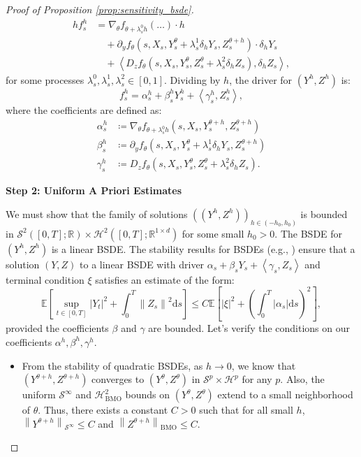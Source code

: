\documentclass[qian]{imsart}
\newcommand{\R}{\mathbb{R}}
\newcommand{\E}{\mathbb{E}}
\newcommand{\dd}{\mathrm{d}}
\newcommand{\norm}[1]{\left\lVert#1\right\rVert}
\newcommand{\abs}[1]{\left\lvert#1\right\rvert}
\newcommand{\scpr}[2]{\left\langle #1, #2 \right\rangle}
\theoremstyle{plain}
\theoremstyle{definition}
\begin{document}
\begin{proof}[Proof of Proposition \ref{prop:sensitivity_bsde}]
\begin{align*}
    h f^h_s &= \nabla_\theta f_{\theta + \lambda_s^0 h}(\dots) \cdot h \\
    &\quad + \partial_y f_\theta(s, X_s, Y^\theta_s + \lambda_s^1 \delta_h Y_s, Z^{\theta+h}_s) \cdot \delta_h Y_s \\
    &\quad + \scpr{ D_z f_\theta(s, X_s, Y^{\theta}_s, Z^{\theta}_s + \lambda_s^2 \delta_h Z_s) }{ \delta_h Z_s },
\end{align*}
for some processes $\lambda_s^0, \lambda_s^1, \lambda_s^2 \in [0,1]$. Dividing by $h$, the driver for $(Y^h, Z^h)$ is:
\begin{equation} \label{eq:proof_yh_driver}
    f^h_s = \alpha^h_s + \beta^h_s Y^h_s + \scpr{\gamma^h_s}{Z^h_s},
\end{equation}
where the coefficients are defined as:
\begin{align*}
    \alpha^h_s &\coloneqq \nabla_\theta f_{\theta + \lambda_s^0 h}(s, X_s, Y^{\theta+h}_s, Z^{\theta+h}_s) \\
    \beta^h_s &\coloneqq \partial_y f_\theta(s, X_s, Y^\theta_s + \lambda_s^1 \delta_h Y_s, Z^{\theta+h}_s) \\
    \gamma^h_s &\coloneqq D_z f_\theta(s, X_s, Y^{\theta}_s, Z^{\theta}_s + \lambda_s^2 \delta_h Z_s).
\end{align*}

\textbf{Step 2: Uniform A Priori Estimates}

We must show that the family of solutions $((Y^h, Z^h))_{h \in (-h_0, h_0)}$ is bounded in $\mathcal{S}^2([0,T];\R) \times \mathcal{H}^2([0,T];\R^{1 \times d})$ for some small $h_0 > 0$. The BSDE for $(Y^h, Z^h)$ is a linear BSDE. The stability results for BSDEs (e.g., \cite{ElKarouiPengQuenez1997}) ensure that a solution $(Y,Z)$ to a linear BSDE with driver $\alpha_s + \beta_s Y_s + \scpr{\gamma_s}{Z_s}$ and terminal condition $\xi$ satisfies an estimate of the form:
\[ \E\left[\sup_{t \in [0,T]} \abs{Y_t}^2 + \int_0^T \norm{Z_s}^2 \dd s \right] \le C \E\left[\abs{\xi}^2 + \left(\int_0^T \abs{\alpha_s} \dd s\right)^2 \right], \]
provided the coefficients $\beta$ and $\gamma$ are bounded. Let's verify the conditions on our coefficients $\alpha^h, \beta^h, \gamma^h$.
\begin{itemize}
    \item From the stability of quadratic BSDEs, as $h \to 0$, we know that $(Y^{\theta+h}, Z^{\theta+h})$ converges to $(Y^\theta, Z^\theta)$ in $\mathcal{S}^p \times \mathcal{H}^p$ for any $p$. Also, the uniform $\mathcal{S}^\infty$ and $\mathcal{H}^2_{\mathrm{BMO}}$ bounds on $(Y^\theta, Z^\theta)$ extend to a small neighborhood of $\theta$. Thus, there exists a constant $C>0$ such that for all small $h$, $\norm{Y^{\theta+h}}_{\mathcal{S}^\infty} \le C$ and $\norm{Z^{\theta+h}}_{\mathrm{BMO}} \le C$.
    

\end{itemize}
\end{proof}
\end{document}
